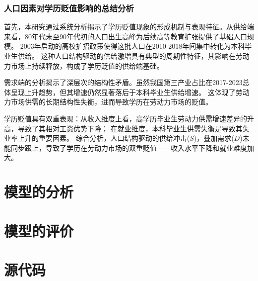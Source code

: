 \documentclass[withoutpreface,bwprint]{cumcmthesis} %
\begin{document}
\subsubsection{人口因素对学历贬值影响的总结分析}

首先，本研究通过系统分析揭示了学历贬值现象的形成机制与表现特征。从供给端来看，80年代末至90年代初的人口出生高峰为后续高等教育扩张提供了基础人口规模。
2003年启动的高校扩招政策使得这批人口在2010-2018年间集中转化为本科毕业生供给。
这种人口结构驱动的供给激增具有典型的周期性特征，其影响在劳动力市场上持续释放，构成了学历贬值的供给端基础。

需求端的分析揭示了深层次的结构性矛盾。虽然我国第三产业占比在2017-2023总体呈现上升趋势，但其增速仍然显著落后于本科毕业生供给增速。
这体现了劳动力市场供需的长期结构性失衡，进而导致学历在劳动力市场的贬值。

学历贬值具有双重表现：从收入维度上看，高学历毕业生劳动力供需增速差异的升高，导致了其相对工资优势下降；
在就业维度，本科毕业生供需失衡是导致其失业率上升的重要因素。
综合分析，人口结构驱动的供给冲击($S$)，叠加需求($D$)未能同步跟上，导致了学历在劳动力市场的双重贬值——收入水平下降和就业难度加大。

\section{模型的分析}

\section{模型的评价}




\newpage
\appendix
\section{源代码}

\newpage
\end{document}

